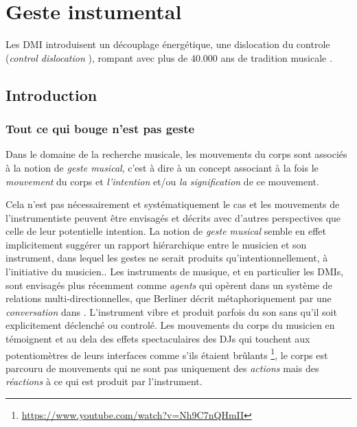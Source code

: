 %
\chapter{Geste instumental}
\label{ch:transparency}



Les DMI introduisent un découplage énergétique, une dislocation du controle (\textit{control dislocation} \cite{miranda_new_2006}), rompant avec plus de 40.000 ans de tradition musicale \cite{conard_new_2009}.

\section{Introduction}

\subsection{Tout ce qui bouge n'est pas geste}

Dans le domaine de la recherche musicale, les mouvements du corps sont associés à la notion de \textit{geste musical}, c'est à dire à un concept associant à la fois le \textit{mouvement} du corps et \textit{l'intention} et/ou \textit{la signification} de ce mouvement. 

Cela n'est pas nécessairement et systématiquement le cas et les mouvements de l'instrumentiste peuvent être envisagés et décrits avec d'autres perspectives que celle de leur potentielle intention.  La notion de \textit{geste musical} semble en effet implicitement suggérer un rapport hiérarchique entre le musicien et son instrument, dans lequel les gestes ne serait produits qu'intentionnellement, à l'initiative du musicien.. Les instruments de musique, et en particulier les DMIs, sont envisagés plus récemment comme \textit{agents} qui opèrent dans un système de relations multi-directionnelles, que Berliner décrit métaphoriquement par une \textit{conversation} dans \cite{berliner_thinking_2009}.  L'instrument vibre et produit parfois du son sans qu'il soit explicitement déclenché ou controlé. Les mouvements du corps du musicien en témoignent et au dela des effets spectaculaires des DJs qui touchent aux potentiomètres de leurs interfaces comme s'ils étaient brûlants \footnote{\url{https://www.youtube.com/watch?v=Nh9C7nQHmII}}, le corps est parcouru de mouvements qui ne sont pas uniquement des \textit{actions} mais des \textit{réactions} à ce qui est produit par l'instrument. 

